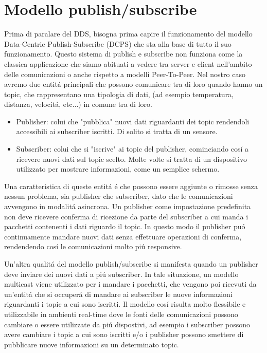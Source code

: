 \section{Modello publish/subscribe}
Prima di paralare del DDS, bisogna prima capire il funzionamento
del modello Data-Centric Publish-Subscribe (DCPS) 
che sta alla base di tutto il suo funzionamento.
Questo sistema di publish e subscribe non funziona come la 
classica applicazione che siamo abituati a vedere tra server e
client nell'ambito delle comunicazioni o anche rispetto a 
modelli Peer-To-Peer.
Nel nostro caso avremo due entitá principali
che possono comunicare tra di loro quando hanno un topic, che
rappresentano una tipologia di dati, (ad esempio temperatura, 
distanza, velocitá, etc...) in comune tra di loro.
\begin{itemize}
    \item Publisher: colui che "pubblica" nuovi dati riguardanti dei
    topic rendendoli accessibili ai subscriber iscritti. 
    Di solito si tratta di un sensore.
    \item Subscriber: colui che si "iscrive" ai topic del publisher, 
    cominciando
    cosí a ricevere nuovi dati sul topic scelto. Molte volte si tratta
    di un dispositivo utilizzato per mostrare informazioni, come un
    semplice schermo.
\end{itemize}
Una caratteristica di queste entitá é che possono essere aggiunte o rimosse
senza nessun problema, sia publisher che subscriber, dato che le 
comunicazioni avvengono in modalitá asincrona. Un publisher come impostazione
predefinita non deve ricevere conferma di ricezione da parte del 
subscriber a cui manda i pacchetti contenenti i dati riguardo il topic.
In questo modo il publisher puó continuamente mandare nuovi dati
senza effettuare operazioni di conferma, rendendendo cosí le comunicazioni
molto piú responsive. 

Un'altra qualitá del modello
publish/subscribe si manifesta quando
un publisher deve inviare dei nuovi dati a piú subscriber. 
In tale situazione, un
modello multicast viene utilizzato per i mandare i pacchetti, che vengono 
poi ricevuti da un'entitá che si occuperá di mandare ai subscriber
le nuove informazioni riguardanti i topic a cui sono iscritti.
Il modello cosí risulta molto
flessibile e utilizzabile in ambienti real-time dove le fonti delle
comunicazioni possono cambiare o essere utilizzate da piú dispostivi,
ad esempio i subscriber possono avere cambiare i topic a cui 
sono iscritti e/o i publisher possono smettere di pubblicare nuove
informazioni su un determinato topic.\cite{OH2010318}

